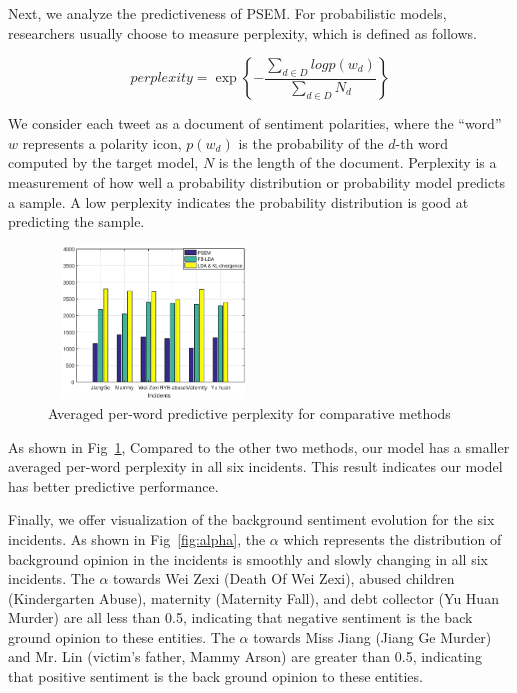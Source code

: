\documentclass[runningheads]{llncs}
\begin{document}
Next, we analyze the predictiveness of PSEM. For probabilistic models, researchers usually choose to measure perplexity, which is defined as follows. 

\begin{equation}
    perplexity= \exp\left\{-\frac{\sum_{d \in D}logp(w_d)}{\sum_{d \in D}N_d} \right\}
\end{equation}

We consider each tweet as a document of sentiment polarities, where the ``word'' $w$ represents a polarity icon, $p(w_d)$ is the probability of the $d$-th word computed by the target model, $N$ is the length of the document. 
Perplexity is a measurement of how well a probability distribution or probability model predicts a sample. A low perplexity indicates the probability distribution is good at predicting the sample. 
\vspace{-0.6cm}
\begin{figure}
    \centering
    \includegraphics[width=0.5\textwidth,height=1.6in]{perplexity.eps}
    \setlength{\abovecaptionskip}{-0.1cm}
    \caption{Averaged per-word predictive perplexity for comparative methods}\label{fig:perplexity}
\end{figure}

As shown in Fig~\ref{fig:perplexity},  Compared to the other two methods, our model has a smaller averaged per-word perplexity in all six incidents. This result indicates our model has better predictive performance.


Finally, we offer visualization of the background sentiment evolution for the six incidents. 
As shown in Fig~\ref{fig:alpha}, the $\alpha$ which represents the distribution of background opinion in the incidents is smoothly and slowly changing in all six incidents. The $\alpha$ towards Wei Zexi (Death Of Wei Zexi), abused children (Kindergarten Abuse), maternity (Maternity Fall), and debt collector (Yu Huan Murder) are all less than 0.5, indicating that negative sentiment is the back ground opinion to these entities. The $\alpha$ towards Miss Jiang (Jiang Ge Murder) and Mr. Lin (victim's father, Mammy Arson) are greater than 0.5, indicating that positive sentiment is the back ground opinion to these entities.
\end{document}
